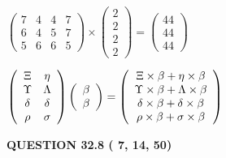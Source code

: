 \documentclass[12pt]{article}
\begin{document}
  
 
 
\noindent{}

 
$\left( \begin{array}{ccccccccccccccc}
           7 & 
           4 & 
           4 & 
           7 \\ 
           6 & 
           4 & 
           5 & 
           7 \\ 
           5 & 
           6 & 
           6 & 
           5
\end{array}\right) \times
\left( \begin{array}{c}
           2 \\ 
           2 \\ 
           2 \\ 
           2
\end{array}\right)  =
\left( \begin{array}{c}
          44 \\ 
          44 \\ 
          44
\end{array}\right)  $
 
$  %
 \left( \begin{array}
 {
 c
 c
 }
                    \Xi & 
 \eta \\ 
 \Upsilon & 
 \Lambda \\ 
 \delta & 
 \delta \\ 
 \rho & 
 \sigma
 \end{array} \right)
 \left( \begin{array}
 {
 c
 }
 \beta \\ 
 \beta
 \end{array} \right)
=
  \left( \begin{array}
 {
 c
 }
                    \Xi \times  \beta   +  \eta \times  \beta \\ 
 \Upsilon \times  \beta   +  \Lambda \times  \beta \\ 
 \delta \times  \beta   +  \delta \times  \beta \\ 
 \rho \times  \beta   +  \sigma \times  \beta
 \end{array} \right)
$
 
 
 
  
\vspace{0.2in}
  
{\textbf{\Large{QUESTION
32.8 
 (          7,         14,         50)
}}}
  
  
 
 
\noindent{}
 
\end{document}
